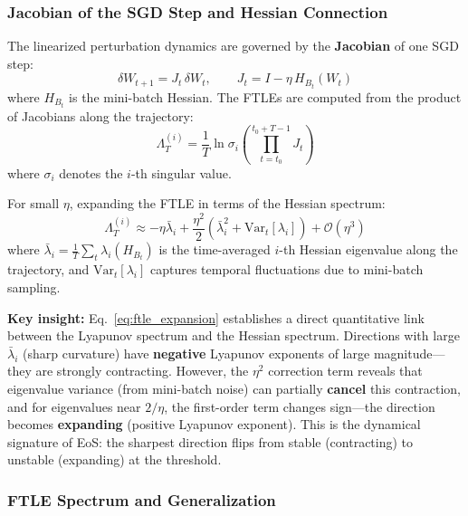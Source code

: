 \documentclass[
  journal=largetwo,
  simfonts=false,
  year=2025,
  volume=37,
]{cup-journal}
\begin{document}
\subsubsection{Jacobian of the SGD Step and Hessian Connection}

The linearized perturbation dynamics are governed by the \textbf{Jacobian} of one SGD step:
\begin{equation}
    \delta W_{t+1} = J_t \, \delta W_t, \qquad J_t = I - \eta\, H_{B_t}(W_t)
\end{equation}
where $H_{B_t}$ is the mini-batch Hessian. The FTLEs are computed from the product of Jacobians along the trajectory:
\begin{equation}
    \Lambda_T^{(i)} = \frac{1}{T} \ln \sigma_i\!\left(\prod_{t=t_0}^{t_0+T-1} J_t\right)
\end{equation}
where $\sigma_i$ denotes the $i$-th singular value.

For small $\eta$, expanding the FTLE in terms of the Hessian spectrum:
\begin{equation}\label{eq:ftle_expansion}
    \Lambda_T^{(i)} \approx -\eta \bar{\lambda}_i + \frac{\eta^2}{2}\left(\bar{\lambda}_i^2 + \mathrm{Var}_t[\lambda_i]\right) + \mathcal{O}(\eta^3)
\end{equation}
where $\bar{\lambda}_i = \frac{1}{T}\sum_t \lambda_i(H_{B_t})$ is the time-averaged $i$-th Hessian eigenvalue along the trajectory, and $\mathrm{Var}_t[\lambda_i]$ captures temporal fluctuations due to mini-batch sampling.

\textbf{Key insight:} Eq.~\eqref{eq:ftle_expansion} establishes a direct quantitative link between the Lyapunov spectrum and the Hessian spectrum. Directions with large $\bar{\lambda}_i$ (sharp curvature) have \textbf{negative} Lyapunov exponents of large magnitude---they are strongly contracting. However, the $\eta^2$ correction term reveals that eigenvalue variance (from mini-batch noise) can partially \textbf{cancel} this contraction, and for eigenvalues near $2/\eta$, the first-order term changes sign---the direction becomes \textbf{expanding} (positive Lyapunov exponent). This is the dynamical signature of EoS: the sharpest direction flips from stable (contracting) to unstable (expanding) at the threshold.

\subsubsection{FTLE Spectrum and Generalization}
\end{document}
